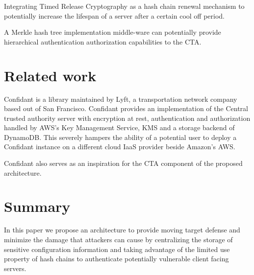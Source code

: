 \documentclass{sig-alternate-05-2015}
\begin{document}
Integrating Timed Release Cryptography \cite{chalkias_timed_2006} as a hash chain renewal mechanism to potentially increase the lifespan of a server after a certain cool off period.

A Merkle hash tree implementation middle-ware can potentially provide hierarchical authentication authorization \cite{yi_cloud_2012} capabilities to the CTA.

\section{Related work}

Confidant \cite{lyft_confidant:_2015} is a library maintained by Lyft, a transportation network company based out of San Francisco. Confidant provides an implementation of the Central trusted authority server with encryption at rest, authentication and authorization handled by AWS's Key Management Service, KMS and a storage backend of DynamoDB. This severely hampers the ability of a potential user to deploy a Confidant instance on a different cloud IaaS provider beside Amazon's AWS. 

Confidant also serves as an inspiration for the CTA component of the proposed architecture.

\section{Summary}

In this paper we propose an architecture to provide moving target defense and minimize the damage that attackers can cause by centralizing the storage of sensitive configuration information and taking advantage of the limited use property of hash chains to authenticate potentially vulnerable client facing servers. 





%
%
\end{document}
